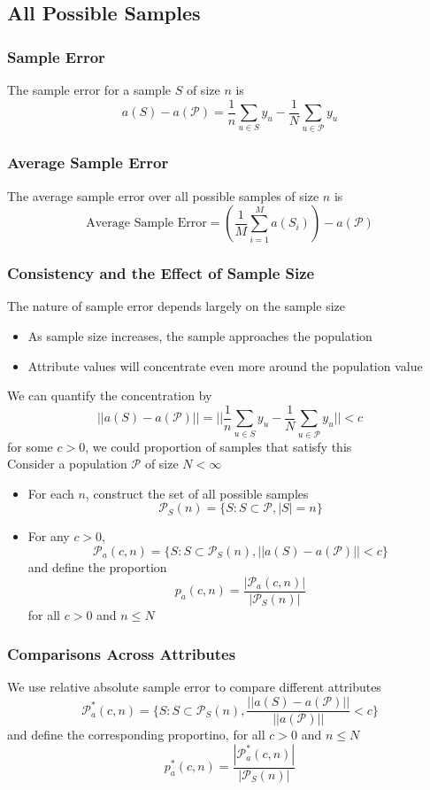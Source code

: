 \documentclass[11pt]{article}
\begin{document}
\subsection{All Possible Samples}
\subsubsection*{Sample Error}
The sample error for a sample $S$ of size $n$ is 
\[a(S)-a(\mathcal{P}) = \frac{1}{n}\sum_{u\in S}y_u - \frac{1}{N}\sum_{u\in\mathcal{P}}y_u\]
\subsubsection*{Average Sample Error}
The average sample error over all possible samples of size $n$ is 
\[\text{Average Sample Error} = (\frac{1}{M}\sum_{i=1}^{M}a(S_i))-a(\mathcal{P})\]    
\subsubsection{Consistency and the Effect of Sample Size}
The nature of sample error depends largely on the sample size
\begin{itemize}
    \item As sample size increases, the sample approaches the population  
    \item Attribute values will concentrate even more around the population value 
\end{itemize}
We can quantify the concentration by 
\[||a(S)-a(\mathcal{P})|| = ||\frac{1}{n}\sum_{u\in S}y_u-\frac{1}{N}\sum_{u\in\mathcal{P}}y_u||<c\]   
for some $c>0$, we could proportion of samples that satisfy this \\
Consider a population $\mathcal{P}$ of size $N<\infty$
\begin{itemize}
    \item For each $n$, construct the set of all possible samples \[\mathcal{P}_S(n) = \{S:S\subset\mathcal{P}, |S|=n\}\]    
    \item For any $c>0$, \[\mathcal{P}_a(c,n) = \{S:S\subset\mathcal{P}_S(n), ||a(S)-a(\mathcal{P})||<c\}\] and define the proportion \[p_a(c,n) = \frac{|\mathcal{P}_a(c,n)|}{|\mathcal{P}_S(n)|}\]   for all $c>0$ and $n\leq N$
\end{itemize}
\subsubsection{Comparisons Across Attributes}
We use relative absolute sample error to compare different attributes 
\[\mathcal{P}^*_a(c,n)=\{S:S\subset\mathcal{P}_S(n), \frac{||a(S)-a(\mathcal{P})||}{||a(\mathcal{P})||}<c\}\] and define the corresponding proportino, for all $c>0$ and $n\leq N$
\[p_a^*(c,n) = \frac{|\mathcal{P}_a^*(c,n)|}{|\mathcal{P}_S(n)|}\]
\end{document}
